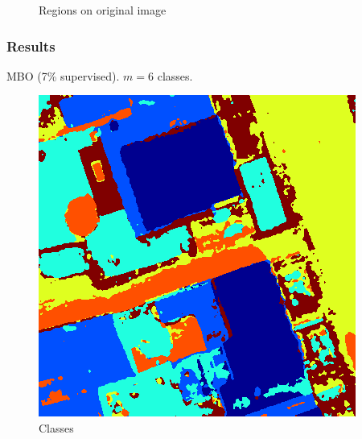 \documentclass{beamer}
\begin{document}
\begin{frame}
\begin{figure}[ht]
\begin{minipage}[b]{0.45\linewidth}
      \caption{Regions on original image}
    \end{minipage}
  \end{figure}
\end{frame}


\begin{frame}
  \frametitle{Results}
  MBO (7\% supervised). $m = 6$ classes.
  \begin{figure}[ht]
    \begin{minipage}[b]{0.45\linewidth}
      \centering
      \includegraphics[width=\textwidth]{./Images/DFC2015/MBO/classification.png}
      \caption{Classes}
    \end{minipage}
    \begin{minipage}[b]{0.45\linewidth}
      \centering

\end{minipage}
\end{figure}
\end{frame}
\end{document}
